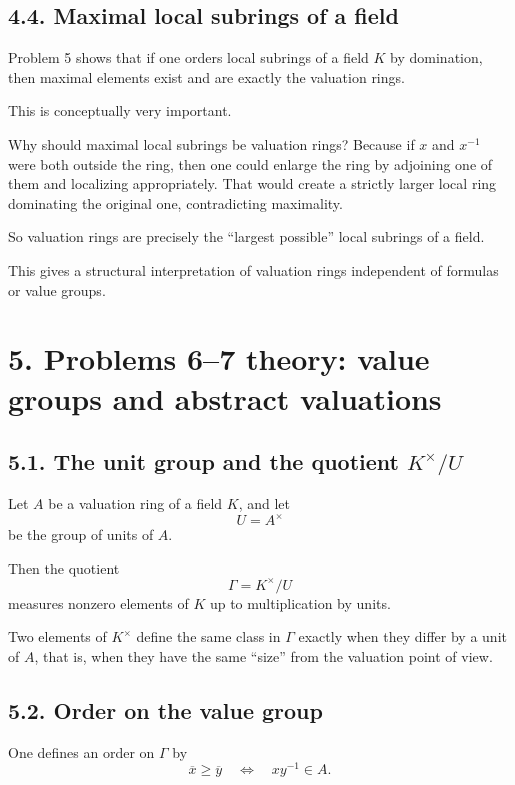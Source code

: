 \documentclass[12pt,a4paper]{article}
\theoremstyle{plain}
\theoremstyle{definition}      %
\begin{document}
\subsection*{4.4. Maximal local subrings of a field}

Problem 5 shows that if one orders local subrings of a field \(K\) by domination, then maximal elements exist and are exactly the valuation rings.

This is conceptually very important.

Why should maximal local subrings be valuation rings? Because if \(x\) and \(x^{-1}\) were both outside the ring, then one could enlarge the ring by adjoining one of them and localizing appropriately. That would create a strictly larger local ring dominating the original one, contradicting maximality.

So valuation rings are precisely the ``largest possible'' local subrings of a field.

This gives a structural interpretation of valuation rings independent of formulas or value groups.

\bigskip

\section*{5. Problems 6--7 theory: value groups and abstract valuations}

\subsection*{5.1. The unit group and the quotient \texorpdfstring{$K^\times/U$}{K*/U}}

Let \(A\) be a valuation ring of a field \(K\), and let
\[
U=A^\times
\]
be the group of units of \(A\).

Then the quotient
\[
\Gamma=K^\times/U
\]
measures nonzero elements of \(K\) up to multiplication by units.

Two elements of \(K^\times\) define the same class in \(\Gamma\) exactly when they differ by a unit of \(A\), that is, when they have the same ``size'' from the valuation point of view.

\subsection*{5.2. Order on the value group}

One defines an order on \(\Gamma\) by
\[
\overline{x}\ge \overline{y}
\quad\Longleftrightarrow\quad
xy^{-1}\in A.
\]
\end{document}
